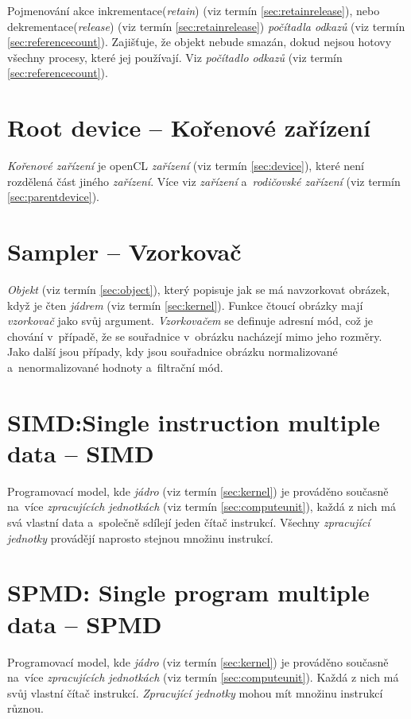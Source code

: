 Pojmenování akce inkrementace(\emph{retain}) (viz termín \ref{sec:retainrelease}), nebo dekrementace(\emph{release}) (viz termín \ref{sec:retainrelease}) \emph{počítadla odkazů} (viz termín \ref{sec:referencecount}). Zajišťuje, že objekt nebude smazán, dokud nejsou hotovy
všechny procesy, které jej používají. Viz \emph{počítadlo odkazů} (viz termín \ref{sec:referencecount}).

\section{Root device -- Kořenové zařízení}
\label{sec:rootdevice}

\emph{Kořenové zařízení} je openCL \emph{zařízení} (viz termín \ref{sec:device}), které není rozdělená část jiného \emph{zařízení}. Více viz \emph{zařízení} a~\emph{rodičovské zařízení} (viz termín \ref{sec:parentdevice}).

\section{Sampler -- Vzorkovač}
\label{sec:sampler}

\emph{Objekt} (viz termín \ref{sec:object}), který popisuje jak se má navzorkovat obrázek, když je čten \emph{jádrem} (viz termín \ref{sec:kernel}). Funkce čtoucí obrázky mají \emph{vzorkovač} jako svůj argument.
\emph{Vzorkovačem} se definuje adresní mód, což je chování v~případě, že se souřadnice v~obrázku nacházejí mimo jeho rozměry.  Jako další jsou případy, kdy jsou souřadnice obrázku normalizované a~nenormalizované hodnoty a~filtrační mód.

\section{SIMD:Single instruction multiple data -- SIMD}
\label{sec:simd}

Programovací model, kde \emph{jádro} (viz termín \ref{sec:kernel}) je prováděno současně na~více \emph{zpracujících jednotkách} (viz termín \ref{sec:computeunit}), každá z nich má svá vlastní data a~společně sdílejí jeden čítač instrukcí. Všechny \emph{zpracující jednotky} provádějí naprosto stejnou množinu instrukcí.

\section{SPMD: Single program multiple data -- SPMD}
\label{sec:spmd}

Programovací model, kde \emph{jádro} (viz termín \ref{sec:kernel}) je prováděno současně na~více \emph{zpracujících jednotkách} (viz termín \ref{sec:computeunit}). Každá z nich má svůj vlastní čítač instrukcí. \emph{Zpracující jednotky} mohou mít množinu instrukcí různou.

